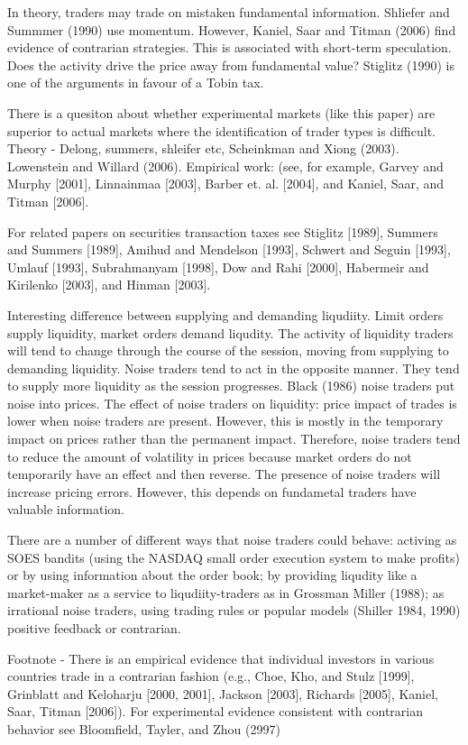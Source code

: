 \documentclass[12pt, a4paper, oneside]{article} %
\begin{document}
In theory, traders may trade on mistaken fundamental information.  Shliefer and Summmer (1990) use momentum.  However, Kaniel, Saar and Titman (2006) find evidence of contrarian strategies. This is associated with short-term speculation. Does the activity drive the price away from fundamental value? Stiglitz (1990) is one of the arguments in favour of a Tobin tax. 

There is a quesiton about whether experimental markets (like this paper) are superior to actual markets where the identification of trader types is difficult.  Theory - Delong, summers, shleifer etc,  Scheinkman and Xiong (2003).  Lowenstein and Willard (2006).  Empirical work:  (see, for example, Garvey and Murphy [2001], Linnainmaa [2003], Barber et. al. [2004], and Kaniel, Saar, and Titman [2006].  

For related papers on securities transaction taxes see Stiglitz [1989], Summers and Summers [1989], 
Amihud and Mendelson [1993], Schwert and Seguin [1993], Umlauf [1993], Subrahmanyam [1998], Dow 
and Rahi [2000], Habermeir and Kirilenko [2003], and Hinman [2003]. 

Interesting difference between supplying and demanding liqudiity.  Limit orders supply liquidity, market orders demand liqudity.  The activity of liquidity traders will tend to change through the course of the session, moving from supplying to demanding liquidity. Noise traders tend to act in the opposite manner.  They tend to supply more liquidity as the session progresses. Black (1986) noise traders put noise into prices.  The effect of noise traders on liquidity: price impact of trades is lower when noise traders are present.  However, this is mostly in the temporary impact on prices rather than the permanent impact. Therefore, noise traders tend to reduce the amount of volatility in prices because market orders do not temporarily have an effect and then reverse.  The presence of noise traders will increase pricing errors. However, this depends on fundametal traders have valuable information. 

There are a number of different ways that noise traders could behave:  activing as SOES bandits (using the NASDAQ small order execution system to make profits) or by using information about the order book; by providing liqudity like a market-maker as a service to liqudiity-traders as in Grossman Miller (1988);  as irrational noise traders, using trading rules or popular models (Shiller 1984, 1990) positive feedback or contrarian.  

Footnote -  There is an empirical evidence that individual investors in various countries trade in a contrarian fashion (e.g., Choe, Kho, and Stulz [1999], Grinblatt and Keloharju [2000, 2001], Jackson [2003], Richards [2005], Kaniel, Saar, Titman [2006]). For experimental evidence consistent with contrarian behavior see 
Bloomfield, Tayler, and Zhou (2997)
\end{document}
